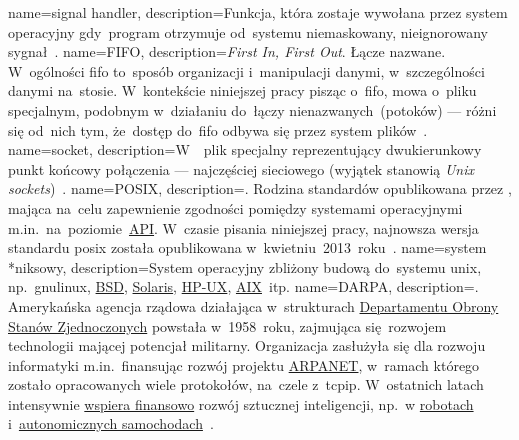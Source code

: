 {
	name={signal handler},
	description={Funkcja, która zostaje wywołana przez system operacyjny gdy~program otrzymuje od~systemu niemaskowany, nieignorowany sygnał~\cite{signal-handler}.}
}
{
	name={FIFO},
	description={\emph{First In, First Out}. Łącze nazwane. W~ogólności \gls{fifo} to~sposób organizacji i~manipulacji danymi, w~szczególności danymi na~stosie. W~kontekście niniejszej pracy pisząc o~\gls{fifo}, mowa o~pliku specjalnym, podobnym w~działaniu do~łączy nienazwanych~(potoków) --- różni się od~nich tym, że~dostęp do~\gls{fifo} odbywa się przez system plików~\cite{fifo-manual}.}
}
{
	name={socket},
	description={W~~plik specjalny reprezentujący dwukierunkowy punkt końcowy połączenia --- najczęściej sieciowego (wyjątek stanowią \emph{Unix sockets})~\cite{socket-definition-oracle}.}
}
{
	name={POSIX},
	description={. Rodzina standardów opublikowana przez , mająca na~celu zapewnienie zgodności pomiędzy systemami operacyjnymi m.in.~na~poziomie~\href{https://en.wikipedia.org/wiki/Application_programming_interface}{API}. W~czasie pisania niniejszej pracy, najnowsza wersja standardu \gls{posix} została opublikowana w~kwietniu~2013~roku~\cite{posix-ieee,posix-opengroup}.}
}
{
	name={system \mbox{*niksowy}},
	description={System operacyjny zbliżony budową do~systemu \gls{unix}, np.~\gls{gnulinux}, \href{https://en.wikipedia.org/wiki/Berkeley_Software_Distribution}{BSD}, \href{https://en.wikipedia.org/wiki/Solaris_(operating_system)}{Solaris}, \href{https://en.wikipedia.org/wiki/HP-UX}{HP-UX}, \href{https://en.wikipedia.org/wiki/Secure_Shell}{AIX}~itp.}
}
{
	name={DARPA},
	description={. Amerykańska agencja rządowa działająca w~strukturach \href{https://en.wikipedia.org/wiki/United_States_Department_of_Defense}{Departamentu Obrony Stanów Zjednoczonych} powstała w~1958~roku, zajmująca się~rozwojem technologii mającej potencjał militarny. Organizacja zasłużyła się dla rozwoju informatyki m.in.~finansując rozwój projektu \href{https://en.wikipedia.org/wiki/ARPANET}{ARPANET}, w~ramach którego zostało opracowanych wiele protokołów, na~czele z~\gls{tcpip}. W~ostatnich latach intensywnie \href{https://en.wikipedia.org/wiki/SyNAPSE}{wspiera finansowo} rozwój sztucznej inteligencji, np.~w \href{https://en.wikipedia.org/wiki/DARPA_Robotics_Challenge}{robotach} i~\href{https://en.wikipedia.org/wiki/DARPA_Grand_Challenge}{autonomicznych samochodach}~\cite{darpa-grandchallange,darpa-robotics-challange,darpa-robotics-challange-ieee}.}
}
